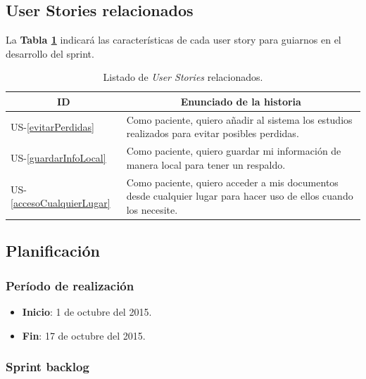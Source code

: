\subsection{User Stories relacionados}
La \textbf{Tabla \ref{US-Sprint7}} indicará las características de cada user story para guiarnos en el desarrollo del sprint.

\begin{table}[h]
	\centering
	\begin{tabular}{|l|p{9cm}|}
		\hline
		\multicolumn{1}{|c|}{\textbf{ID}} &
		\multicolumn{1}{c|}{\textbf{Enunciado de la historia}} \\          
		\hline
		US-\ref{evitarPerdidas} & Como paciente, quiero añadir al sistema los estudios realizados para evitar posibles perdidas.\\
		\hline
		US-\ref{guardarInfoLocal} & Como paciente, quiero guardar mi información de manera local para tener un respaldo.\\
		\hline
		US-\ref{accesoCualquierLugar} & Como paciente, quiero acceder a mis documentos desde cualquier lugar para hacer uso de ellos cuando los necesite.\\
		\hline   
	\end{tabular}
	\caption{Listado de \textit{User Stories} relacionados.}
	\label{US-Sprint7}
\end{table}



\subsection{Planificación}
\subsubsection{Período de realización}
\begin{itemize}
	\item \textbf{Inicio}: 1 de octubre del 2015.
	\item \textbf{Fin}: 17 de octubre del 2015.
\end{itemize}

\subsubsection{Sprint backlog}


